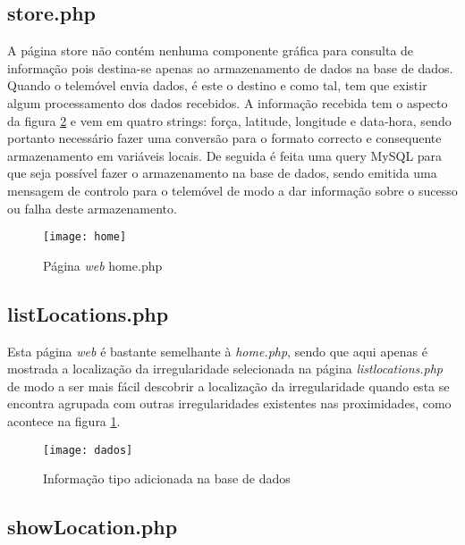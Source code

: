 \subsection{store.php}
\label{sub:store.php}

A página store não contém nenhuma componente gráfica para consulta de informação pois destina-se apenas ao armazenamento de dados na base de dados.
Quando o telemóvel envia dados, é este o destino e como tal, tem que existir algum processamento dos dados recebidos.
A informação recebida tem o aspecto da figura \ref{fig:informacao_tipo_adicionada_na_base_de_dados} e vem em quatro strings: força, latitude, longitude e data-hora, sendo portanto necessário fazer uma conversão para o formato correcto e consequente armazenamento em variáveis locais.
De seguida é feita uma query MySQL para que seja possível fazer o armazenamento na base de dados, sendo emitida uma mensagem de controlo para o telemóvel de modo a dar informação sobre o sucesso ou falha deste armazenamento.

\begin{figure}[htp]
	\centering
	\texttt{[image: home]}
	\caption{Página \emph{web} home.php}
	\label{fig:home.php}
\end{figure}

\subsection{listLocations.php}
\label{sub:listlocations.php}

Esta página \emph{web} é bastante semelhante à \emph{home.php}, sendo que aqui apenas é mostrada a localização da irregularidade selecionada na página \emph{listlocations.php} de modo a ser mais fácil descobrir a localização da irregularidade quando esta se encontra agrupada com outras irregularidades existentes nas proximidades, como acontece na figura \ref{fig:home.php}.

\begin{figure}[htbp]
	\centering
	\texttt{[image: dados]}
	\caption{Informação tipo adicionada na base de dados}
	\label{fig:informacao_tipo_adicionada_na_base_de_dados}
\end{figure}

\subsection{showLocation.php}
\label{sub:showLocation.php}

